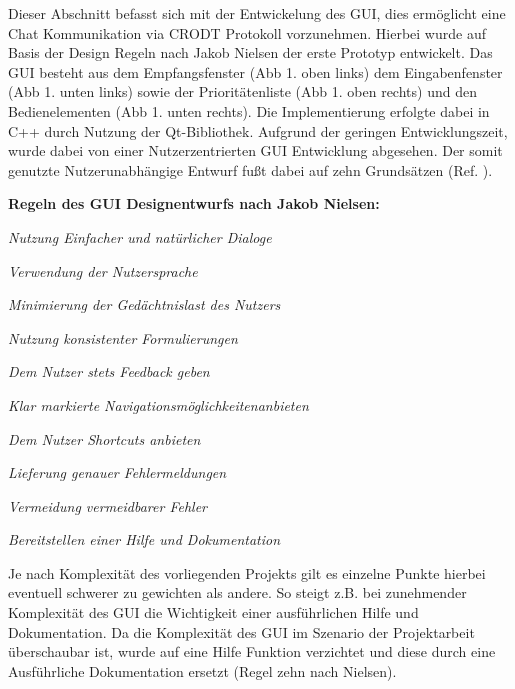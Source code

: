 \label{cap:chatGui}

Dieser Abschnitt befasst sich mit der Entwickelung des \gls{GUI}, dies
erm{\"o}glicht eine Chat Kommunikation via \gls{CRODT} Protokoll vorzunehmen.
Hierbei wurde auf Basis der Design Regeln nach Jakob Nielsen der erste Prototyp
entwickelt. Das GUI besteht aus dem Empfangsfenster (Abb 1. oben links) dem
Eingabenfenster (Abb 1.
unten links) sowie der Priorit{\"a}tenliste (Abb 1. oben rechts) und den
Bedienelementen (Abb 1. unten rechts). Die Implementierung erfolgte dabei in
C++ durch Nutzung der Qt-Bibliothek. Aufgrund der geringen Entwicklungszeit,
wurde dabei von einer Nutzerzentrierten \gls{GUI} Entwicklung
abgesehen. Der somit genutzte Nutzerunabh{\"a}ngige Entwurf fu{\ss}t dabei auf
zehn Grunds{\"a}tzen (Ref. \cite{Nielsen}).

\textbf{Regeln des \gls{GUI} Designentwurfs nach Jakob Nielsen:}

   \begin{compactenum}[I]
     \item \textit{Nutzung Einfacher und nat{\"u}rlicher Dialoge}
     \item \textit{Verwendung der Nutzersprache}
     \item \textit{Minimierung der Ged{\"a}chtnislast des Nutzers}
     \item \textit{Nutzung konsistenter Formulierungen}
     \item \textit{Dem Nutzer stets Feedback geben}
     \item \textit{Klar markierte Navigationsm{\"o}glichkeitenanbieten}
     \item \textit{Dem Nutzer Shortcuts anbieten}
     \item \textit{Lieferung genauer Fehlermeldungen}
     \item \textit{Vermeidung vermeidbarer Fehler}
     \item \textit{Bereitstellen einer Hilfe und Dokumentation}
   \end{compactenum}
   \label{Nielsen}
   

Je nach Komplexit{\"a}t des vorliegenden Projekts gilt es einzelne Punkte
hierbei eventuell schwerer zu gewichten als andere. So steigt z.B. bei
zunehmender Komplexit{\"a}t des \gls{GUI} die Wichtigkeit einer ausf{\"u}hrlichen
Hilfe und Dokumentation. Da die Komplexit{\"a}t des \gls{GUI} im Szenario der
Projektarbeit {\"u}berschaubar ist, wurde auf eine Hilfe Funktion verzichtet und
diese durch eine Ausf{\"u}hrliche Dokumentation ersetzt (Regel zehn nach
Nielsen).

